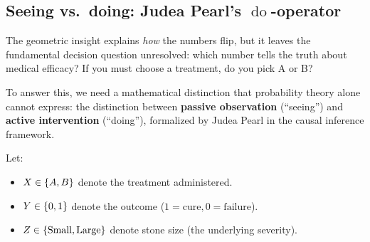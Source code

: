 \subsection{Seeing vs.~doing: Judea Pearl's \texorpdfstring{$\operatorname{do}$}{do}-operator}
\label{ch15:seeing-vs-doing}

The geometric insight explains \emph{how} the numbers flip, but it leaves the fundamental decision question unresolved: which number tells the truth about medical efficacy? If you must choose a treatment, do you pick A or B?

To answer this, we need a mathematical distinction that probability theory alone cannot express: the distinction between \textbf{passive observation} (``seeing'') and \textbf{active intervention} (``doing''), formalized by Judea Pearl in the causal inference framework.

Let:
\begin{itemize}
  \item $X \in \{A, B\}$ denote the treatment administered.
  \item $Y \in \{0, 1\}$ denote the outcome ($1 = \text{cure}, 0 = \text{failure}$).
  \item $Z \in \{\text{Small}, \text{Large}\}$ denote stone size (the underlying severity).
\end{itemize}

